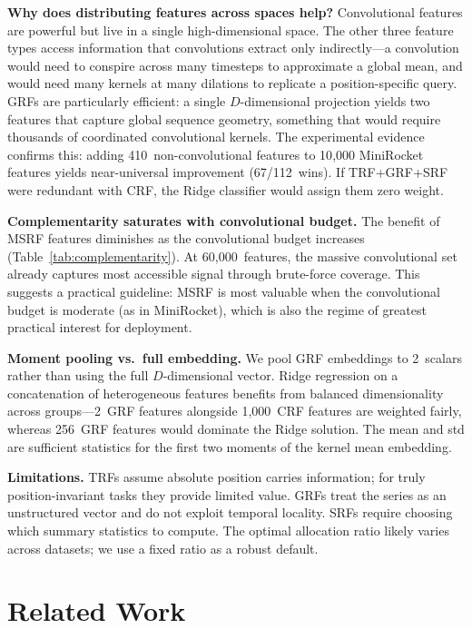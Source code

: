 \documentclass{article}
\begin{document}
\textbf{Why does distributing features across spaces help?}
Convolutional features are powerful but live in a single high-dimensional space.
The other three feature types access information that convolutions extract only indirectly---a convolution would need to conspire across many timesteps to approximate a global mean, and would need many kernels at many dilations to replicate a position-specific query.
GRFs are particularly efficient: a single $D$-dimensional projection yields two features that capture global sequence geometry, something that would require thousands of coordinated convolutional kernels.
The experimental evidence confirms this: adding 410~non-convolutional features to 10{,}000 MiniRocket features yields near-universal improvement (67/112~wins).
If TRF+GRF+SRF were redundant with CRF, the Ridge classifier would assign them zero weight.

\textbf{Complementarity saturates with convolutional budget.}
The benefit of MSRF features diminishes as the convolutional budget increases (Table~\ref{tab:complementarity}).
At 60{,}000~features, the massive convolutional set already captures most accessible signal through brute-force coverage.
This suggests a practical guideline: MSRF is most valuable when the convolutional budget is moderate (as in MiniRocket), which is also the regime of greatest practical interest for deployment.

\textbf{Moment pooling vs.\ full embedding.}
We pool GRF embeddings to 2~scalars rather than using the full $D$-dimensional vector.
Ridge regression on a concatenation of heterogeneous features benefits from balanced dimensionality across groups---2~GRF features alongside 1{,}000~CRF features are weighted fairly, whereas 256~GRF features would dominate the Ridge solution.
The mean and std are sufficient statistics for the first two moments of the kernel mean embedding.

\textbf{Limitations.}
TRFs assume absolute position carries information; for truly position-invariant tasks they provide limited value.
GRFs treat the series as an unstructured vector and do not exploit temporal locality.
SRFs require choosing which summary statistics to compute.
The optimal allocation ratio likely varies across datasets; we use a fixed ratio as a robust default.


\section{Related Work}
\label{sec:related}
\end{document}
